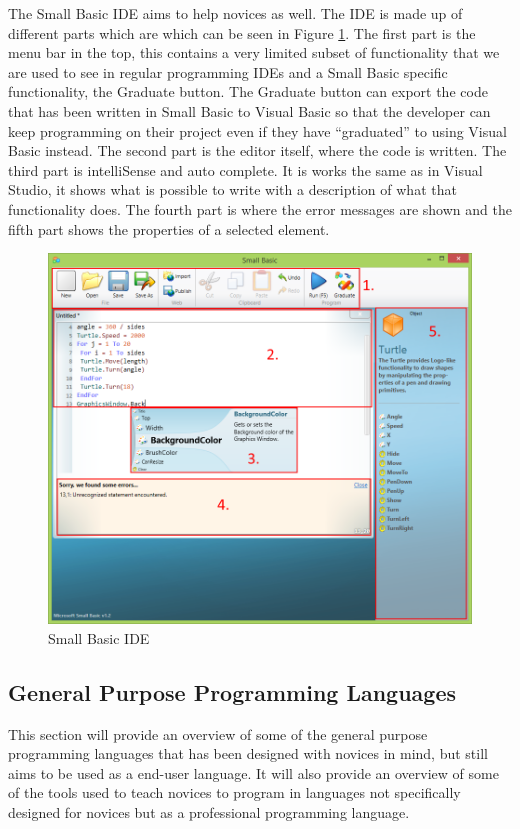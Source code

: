 The Small Basic IDE aims to help novices as well. The IDE is made up of different parts which are which can be seen in Figure \ref{fig:small_basic_ide}. The first part is the menu bar in the top, this contains a very limited subset of functionality that we are used to see in regular programming IDEs and a Small Basic specific functionality, the Graduate button. The Graduate button can export the code that has been written in Small Basic to Visual Basic so that the developer can keep programming on their project even if they have ``graduated'' to using Visual Basic instead. The second part is the editor itself, where the code is written. The third part is intelliSense and auto complete. It is works the same as in Visual Studio, it shows what is possible to write with a description of what that functionality does. The fourth part is where the error messages are shown and the fifth part shows the properties of a selected element.

\begin{figure}[H]
\begin{center}
\includegraphics[scale=0.60]{./pics/SmallBasic.png}
\caption{Small Basic IDE}
\label{fig:small_basic_ide}
\end{center}
\end{figure}

\subsection{General Purpose Programming Languages}
This section will provide an overview of some of the general purpose programming languages that has been designed with novices in mind, but still aims to be used as a end-user language. It will also provide an overview of some of the tools used to teach novices to program in languages not specifically designed for novices but as a professional programming language. 

